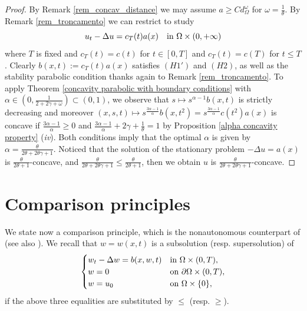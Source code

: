 \documentclass[11pt, reqno]{amsart}
\theoremstyle{definition}
\numberwithin{equation}{section}
\begin{document}
\begin{proof}
By Remark \ref{rem_concav_distance} we may assume $a \geq C d_{\Omega}^{\omega}$ for $\omega=\frac{1}{\theta}$. By Remark \ref{rem_troncamento} we can restrict to study
$$u_t - \Delta u = c_T(t) a(x) \quad \hbox{in $\Omega \times (0,+\infty)$}$$
where $T$ is fixed and $c_T(t)=c(t)$ for $t \in [0,T]$ and $c_T(t)=c(T)$ for $t\leq T$. 
Clearly $b(x,t):=c_T(t) a(x)$ satisfies \hyperlink{H1'}{\((H1') \)} and \hyperlink{H2}{\((H2) \)}, as well as the stability parabolic condition thanks again to Remark \ref{rem_troncamento}.
To apply Theorem \ref{concavity parabolic with boundary conditions} with $\alpha \in (0, \frac{1}{2+2\gamma+\omega}) \subset (0,1)$, we observe that $s \mapsto s^{\alpha-1} b(x,t)$ is strictly decreasing and moreover $(x,s,t) \mapsto s^{\frac{3\alpha-1}{\alpha}}b(x,t^2) = s^{\frac{3\alpha-1}{\alpha}} c(t^2) a(x) $ is concave if $\frac{3\alpha-1}{\alpha} \geq 0$ and $\frac{3\alpha-1}{\alpha} +2 \gamma + \frac{1}{\theta} = 1$ by Proposition \ref{alpha concavity property} (\textit{iv}). 
Both conditions imply that the optimal $\alpha$ is given by $\alpha=\frac{\theta}{2\theta+2 \theta \gamma +1}$. Noticed that the solution of the stationary problem $-\Delta u = a(x)$ is $\frac{\theta}{2\theta+1}$-concave, and $\frac{\theta}{2\theta+2 \theta \gamma +1} \leq \frac{\theta}{2\theta+1}$, then 
we obtain $u$ is $\frac{\theta}{2\theta+2\theta \gamma +1}$-concave.
\end{proof}


\appendix


\section{Comparison principles}
\label{sec_max_priniciples}

We state now a comparison principle, which is the nonautonomous counterpart of \cite[Corollary 2.3]{Dickstein} (see also \cite{CazenaveDicksteinEscobedo}). 
We recall that $w=w(x,t)$ is a subsolution (resp. supersolution) of 
\begin{equation} \label{eq_sub_super_sol}
		\begin{cases}
			w_t-\Delta w = b(x,w,t)&\hbox{in }\Omega\times(0,T),\\
			w=0 &\hbox{on } \partial \Omega\times(0,T),\\
			w=u_0&\hbox{on } \Omega \times \{0\},
		\end{cases}
	\end{equation}
if the above three equalities are substituted by $\leq$ (resp. $\geq$).
\end{document}

